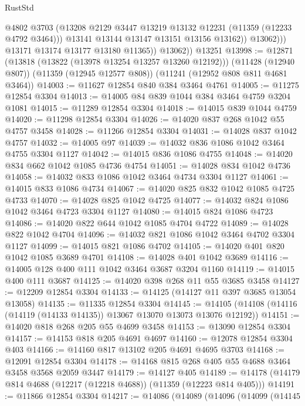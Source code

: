 \begin{lexlean}{RustStd}
\begin{coremodule}
{{{{{{{{{{{{{{{{{{{                      @4802
                      @3703
                      (@13208 @2129 @3447 @13219 @13132 @12231 (@11359 (@12233 @4792 @3464)))
                      @13141
                      @13144
                      @13147
                      @13151
                      @13156
                      @13162))
                  @13062)))
            @13171
            @13174
            @13177
            @13180
            @11365))
        @13062))
    @13251
@13998 := @12871
    (@13818 (@13822 (@13978 @13254 @13257 @13260 @12192)))
    (@11428 (@12940 @807))
    (@11359 (@12945 @12577 @808))
    (@11241 (@12952 @808 @811 @4681 @3464))
@14003 := @11627 @12854 @840 @384 @3464 @4761
@14005 := @11275 @12854 @3304
@14013 := @14005 @84 @839 @1044 @384 @3464 @4759 @3204 @1081
@14015 := @11289 @12854 @3304
@14018 := @14015 @839 @1044 @4759
@14020 := @11298 @12854 @3304
@14026 := @14020 @837 @268 @1042 @55 @4757 @3458
@14028 := @11266 @12854 @3304
@14031 := @14028 @837 @1042 @4757
@14032 := @14005 @97
@14039 := @14032 @836 @1086 @1042 @3464 @4755 @3304 @1127
@14042 := @14015 @836 @1086 @4755
@14048 := @14020 @834 @662 @1042 @1085 @4736 @4754
@14051 := @14028 @834 @1042 @4736
@14058 := @14032 @833 @1086 @1042 @3464 @4734 @3304 @1127
@14061 := @14015 @833 @1086 @4734
@14067 := @14020 @825 @832 @1042 @1085 @4725 @4733
@14070 := @14028 @825 @1042 @4725
@14077 := @14032 @824 @1086 @1042 @3464 @4723 @3304 @1127
@14080 := @14015 @824 @1086 @4723
@14086 := @14020 @822 @644 @1042 @1085 @4704 @4722
@14089 := @14028 @822 @1042 @4704
@14096 := @14032 @821 @1086 @1042 @3464 @4702 @3304 @1127
@14099 := @14015 @821 @1086 @4702
@14105 := @14020 @401 @820 @1042 @1085 @3689 @4701
@14108 := @14028 @401 @1042 @3689
@14116 := @14005 @128 @400 @111 @1042 @3464 @3687 @3204 @1160
@14119 := @14015 @400 @111 @3687
@14125 := @14020 @398 @268 @11 @55 @3685 @3458
@14127 := @12209 @12854 @3304
@14133 := @14125 (@14127 @11 @397 @3685 @13054 @13058)
@14135 := @11335 @12854 @3304
@14145 := @14105 (@14108 (@14116 (@14119 (@14133 @14135)) @13067 @13070 @13073 @13076 @12192))
@14151 := @14020 @818 @268 @205 @55 @4699 @3458
@14153 := @13090 @12854 @3304
@14157 := @14153 @818 @205 @4691 @4697
@14160 := @12078 @12854 @3304 @403
@14166 := @14160 @817 @13102 @205 @4691 @4695 @3703
@14168 := @12091 @12854 @3304
@14178 := @14168 @815 @268 @405 @55 @4688 @3464 @3458 @3568 @2059 @3447
@14179 := @14127 @405
@14189 := @14178 (@14179 @814 @4688 (@12217 (@12218 @4688)) (@11359 (@12223 @814 @405)))
@14191 := @11866 @12854 @3304
@14217 := @14086
    (@14089
      (@14096
        (@14099
          (@14145
}}}}}}}}}}}}}}}}}}}
\end{coremodule}
\end{lexlean}
